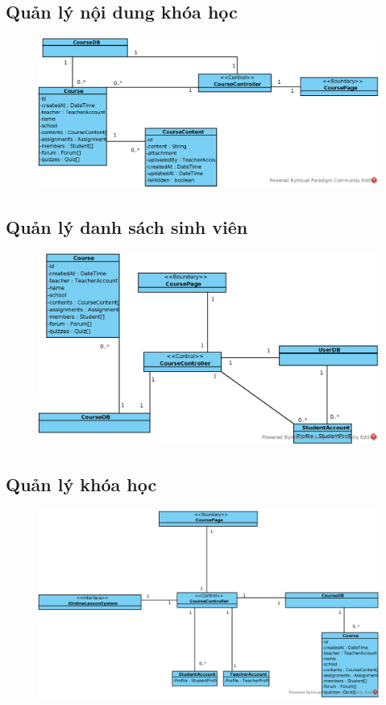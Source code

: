 \documentclass[./../main_file.tex]{subfiles}
\begin{document}
\subsection{Quản lý nội dung khóa học}
\begin{figure}[H]
	\centering
	\includegraphics[width=\linewidth]{./images/define_attribute/ucd_at_manage_contentcourse.eps}
\end{figure}
\subsection{Quản lý danh sách sinh viên}
\begin{figure}[H]
	\centering
	\includegraphics[width=\linewidth]{./images/define_attribute/ucd_at_add_course_mem.eps}
\end{figure}
\subsection{Quản lý khóa học}
\begin{figure}[H]
	\centering
	\includegraphics[width=\linewidth]{./images/define_attribute/ucd_at_create_live_lesson.eps}
\end{figure}
\end{document}
